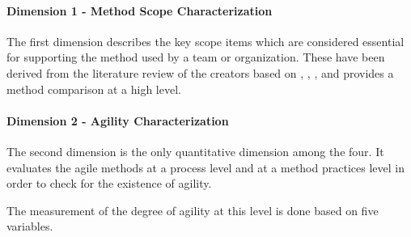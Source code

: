 \paragraph{Dimension 1 - Method Scope Characterization}
The first dimension describes the key scope items which are considered essential for supporting the method used by a team or organization. These have been derived from the literature review of the creators based on \citet{Beck:2004:EPE:1076267}, \citet{koch2005agile}, \citet{Palmer:2001:PGF:600044}, \citet{Highsmith:2000:ASD:323922} and provides a method comparison at a high level.



%

\paragraph{Dimension 2 - Agility Characterization}
The second dimension is the only quantitative dimension among the four.  It evaluates the agile methods at a process level and at a method practices level in order to check for the existence of agility.

The measurement of the degree of agility at this level is done based on five variables. %

